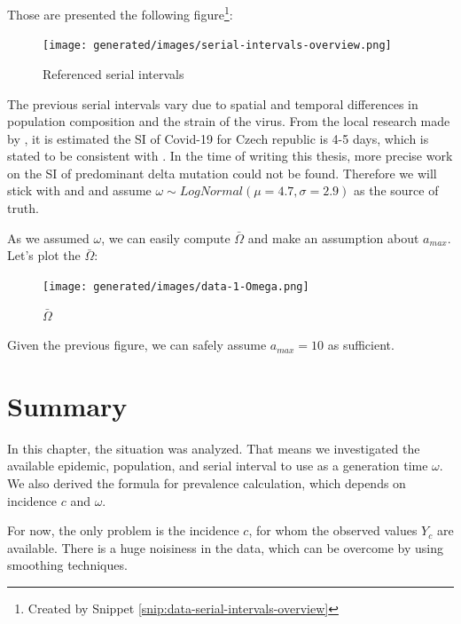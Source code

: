 \documentclass[
  digital, %
  oneside, %
  lof,     %
  lot,     %
]{fithesis4}
\begin{document}
Those are presented the following figure\footnote{Created by Snippet \ref{snip:data-serial-intervals-overview}}:

\begin{figure}[H]
  \begin{center}
    \texttt{[image: generated/images/serial-intervals-overview.png]}
  \end{center}
  \caption{Referenced serial intervals}
  \label{fig:serial-intervals-overview}
\end{figure}

The previous serial intervals vary due to spatial and temporal differences in population composition and the strain of the virus.
From the local research made by \cite{majek2020}, it is estimated the SI of Covid-19 for Czech republic is 4-5 days, which is stated to be consistent with \cite{nishiura2020}. 
In the time of writing this thesis, more precise work on the SI of predominant delta mutation could not be found. 
Therefore we will stick with \cite{majek2020} and \cite{nishiura2020} and assume $\omega \sim LogNormal \left( \mu = 4.7, \sigma = 2.9 \right)$ as the source of truth.

\newpage
As we assumed $\omega$, we can easily compute $\bar{\Omega}$ and make an assumption about $a_{max}$.
Let's plot the $\bar{\Omega}$:

\begin{figure}[H]
  \begin{center}
    \texttt{[image: generated/images/data-1-Omega.png]}
  \end{center}
  \caption{$\bar{\Omega}$}
  \label{fig:data-1-Omega}
\end{figure}

Given the previous figure, we can safely assume 
$a_{max} = 10$ as sufficient.

\section{Summary}

In this chapter, the situation was analyzed.
That means we investigated the available epidemic, population, and serial interval to use as a generation time $\omega$.
We also derived the formula for prevalence calculation, which depends on incidence $c$ and $\omega$.

For now, the only problem is the incidence $c$, for whom the observed values $Y_c$ are available.
There is a huge noisiness in the data, which can be overcome by using smoothing techniques.
\end{document}
